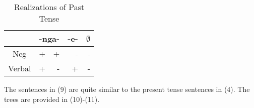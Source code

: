 \documentclass[output=paper]{langsci/langscibook}
\begin{document}
\begin{table}
\caption{Realizations of Past Tense} %
\centering %
\begin{tabular}{c| rr|r|r} %
\hline %
 &\multicolumn{2}{c}{-nga-}& \multicolumn{1}{|c}{-e-}& \multicolumn{1}{|c}{$\emptyset$} \\ [0.5ex] 
\hline %
Neg & + & + & - & -\\ %
Verbal & + & - & +& -\\[1ex] %
\hline %
\end{tabular} 
\label{tab:hresult} 
\end{table} 


The sentences in (9) are quite similar to the present tense sentences in (4). The trees are provided in (10)-(11).




\begin{exe}
\ex
\end{exe}
% 
% 
% 
\end{document}
